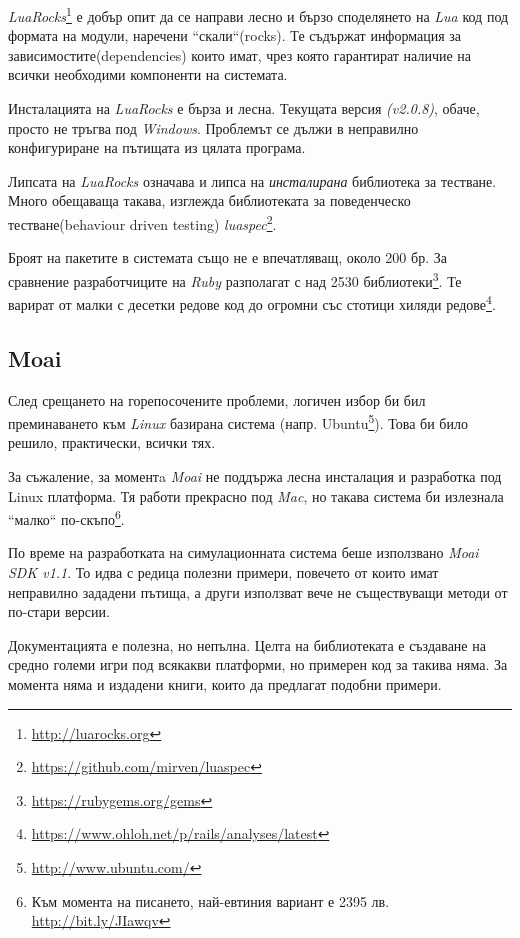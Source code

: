 		\emph{LuaRocks}\footnote{\url{http://luarocks.org}} е добър опит да се направи лесно и бързо
		споделянето на \emph{Lua} код под формата на модули, наречени ``скали``(rocks). 
		Те съдържат информация за зависимостите(dependencies) които имат, чрез която гарантират
		наличие на всички необходими компоненти на системата.
		
		Инсталацията на \emph{LuaRocks} е бърза и лесна. Текущата версия \emph{(v2.0.8)}, обаче,
		просто не тръгва под \emph{Windows}. Проблемът се дължи в неправилно конфигуриране на пътищата
		из цялата програма.
		
		Липсата на \emph{LuaRocks} означава и липса на \emph{инсталирана} библиотека за тестване.
		Много обещаваща такава, изглежда библиотеката за поведенческо тестване(behaviour driven testing) 
		\emph{luaspec}\footnote{\url{https://github.com/mirven/luaspec}}.
		
		Броят на пакетите в системата също не е впечатляващ, около 200 бр. За сравнение разработчиците
		на \emph{Ruby} разполагат с над 2530 библиотеки\footnote{\url{https://rubygems.org/gems}}. 
		Те варират от малки с десетки редове код до огромни
		със стотици хиляди редове\footnote{\url{https://www.ohloh.net/p/rails/analyses/latest}}.
		
	\subsection{Moai}
	
		След срещането на горепосочените проблеми, логичен избор би бил преминаването 
		към \emph{Linux} базирана система (напр. Ubuntu\footnote{\url{http://www.ubuntu.com/}}). 
		Това би било решило, практически, всички тях.
		
		За съжаление, за моментa \emph{Moai} не поддържа лесна инсталация и разработка под Linux платформа.
		Тя работи прекрасно под \emph{Mac}, но такава система би излезнала ``малко`` 
		по-скъпо\footnote{Към момента на писането, най-евтиния вариант е 2395 лв. \url{http://bit.ly/JIawqv}}.
		
		По време на разработката на симулационната система беше използвано \emph{Moai SDK v1.1}.
		То идва с редица полезни примери, повечето от които имат неправилно зададени пътища, а други
		използват вече не съществуващи методи от по-стари версии.
		
		Документацията е полезна, но непълна. Целта на библиотеката е създаване на средно големи игри под всякакви платформи, 
		но примерен код за такива няма. За момента няма и издадени книги, които да предлагат подобни примери.				
		
		